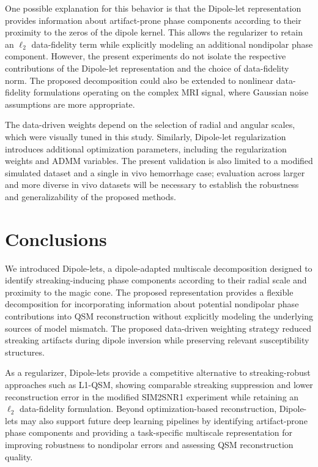 \documentclass{article}
\begin{document}
One possible explanation for this behavior is that the Dipole-let representation provides information about artifact-prone phase components according to their proximity to the zeros of the dipole kernel. This allows the regularizer to retain an $\ell_{2}$ data-fidelity term while explicitly modeling an additional nondipolar phase component. However, the present experiments do not isolate the respective contributions of the Dipole-let representation and the choice of data-fidelity norm. The proposed decomposition could also be extended to nonlinear data-fidelity formulations operating on the complex MRI signal, where Gaussian noise assumptions are more appropriate.

The data-driven weights depend on the selection of radial and angular scales, which were visually tuned in this study. Similarly, Dipole-let regularization introduces additional optimization parameters, including the regularization weights and ADMM variables. The present validation is also limited to a modified simulated dataset and a single in vivo hemorrhage case; evaluation across larger and more diverse in vivo datasets will be necessary to establish the robustness and generalizability of the proposed methods.


\section{Conclusions}
\label{sec:conclusion}

We introduced Dipole-lets, a dipole-adapted multiscale decomposition designed to identify streaking-inducing phase components according to their radial scale and proximity to the magic cone. The proposed representation provides a flexible decomposition for incorporating information about potential nondipolar phase contributions into QSM reconstruction without explicitly modeling the underlying sources of model mismatch. The proposed data-driven weighting strategy reduced streaking artifacts during dipole inversion while preserving relevant susceptibility structures.

As a regularizer, Dipole-lets provide a competitive alternative to streaking-robust approaches such as L1-QSM, showing comparable streaking suppression and lower reconstruction error in the modified SIM2SNR1 experiment while retaining an $\ell_{2}$ data-fidelity formulation. Beyond optimization-based reconstruction, Dipole-lets may also support future deep learning pipelines by identifying artifact-prone phase components and providing a task-specific multiscale representation for improving robustness to nondipolar errors and assessing QSM reconstruction quality.
\end{document}
